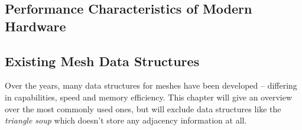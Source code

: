 \subsection{Performance Characteristics of Modern Hardware}






\subsection{Existing Mesh Data Structures}

Over the years, many data structures for meshes have been developed -- differing in capabilities, speed and memory efficiency.
This chapter will give an overview over the most commonly used ones, but will exclude data structures like the \emph{triangle soup} which doesn't store any adjacency information at all.


